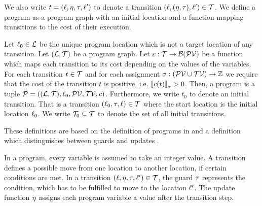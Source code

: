 We also write $t = (\ell, \eta, \tau, \ell')$ to denote a transition $(\ell, (\eta, \tau), \ell') \in \mathcal{T}$.
We define a program as a program graph with an initial location and a function mapping transitions to the cost of their execution.

\begin{definition}[Program] 
  Let $\ell_0 \in \mathcal{L}$ be the unique program location which is not a target location of any transition.
  Let $(\mathcal{L}, \mathcal{T})$ be a program graph.
  Let $c: \mathcal{T} \rightarrow \mathcal{B}(\mathcal{PV})$ be a function which maps each transition to its cost depending on the values of the variables.
  For each transition $t \in \mathcal{T}$ and for each assignment $\sigma: (\mathcal{PV} \cup \mathcal{TV}) \rightarrow \mathbb{Z}$ we require that the cost of the transition $t$ is positive, i.e. $\left\llbracket c(t) \right\rrbracket_{\sigma} > 0$.
  Then, a program is a tuple $\mathcal{P} = ((\mathcal{L}, \mathcal{T}), \ell_0, \mathcal{PV}, \mathcal{TV}, c)$.
  Furthermore, we write $t_0$ to denote an initial transition.
  That is a transition $(\ell_0, \tau, \ell) \in \mathcal{T}$ where the start location is the initial location $\ell_0$.
  We write $\mathcal{T}_0 \subseteq \mathcal{T}$ to denote the set of all initial transitions.
\end{definition}

These definitions are based on the definition of programs in \cite{koat} and a definition which distinguishes between guards and updates \cite{lowerruntime}.

In a program, every variable is assumed to take an integer value.
A transition defines a possible move from one location to another location, if certain conditions are met.
In a transition $(\ell,\eta,\tau,\ell') \in \mathcal{T}$, the guard $\tau$ represents the condition, which has to be fulfilled to move to the location $\ell'$.
The update function $\eta$ assigns each program variable a value after the transition step.


